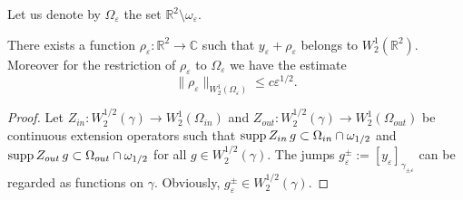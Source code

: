 \documentclass[graybox]{svmult}
\newcommand{\supp}{\mathop{\rm supp}}
\newcommand{\Real}{\mathbb R}
\newcommand{\Cmpl}{\mathbb C}
\newcommand{\eps}{\varepsilon}
\renewcommand{\leq}{\leqslant}
\begin{document}
Let us denote by $\Omega_\eps$ the set $\Real^2\setminus\omega_\eps$.
\begin{lemma}\label{PropW21Corrector}
There exists a function $\rho_\eps\colon \Real^2\to \Cmpl$ such that $y_\eps+\rho_\eps$ belongs to $W_2^1(\Real^2)$. Moreover for the restriction of $\rho_\eps$ to $\Omega_\eps$  we have the estimate
\begin{equation}\label{EstRhoEps}
\|\rho_\eps\|_{W_2^1(\Omega_\eps)}\leq c \eps^{1/2}.
\end{equation}
\end{lemma}

\begin{proof}
Let $Z_{in}\colon W_2^{1/2}(\gamma)\to W_2^1(\Omega_{in})$ and
    $Z_{out}\colon W_2^{1/2}(\gamma)\to W_2^1(\Omega_{out})$
be  continuous extension operators such that
$\supp Z_{in} \,g\subset \Omega_{in}\cap \omega_{1/2}$ and
$\supp Z_{out} \,g\subset \Omega_{out}\cap \omega_{1/2}$
for all $g\in W_2^{1/2}(\gamma)$. The jumps $g_\eps^\pm:=[y_\eps]_{\gamma_{\pm\eps}}$ can be regarded as  functions on $\gamma$. Obviously, $g_\eps^\pm\in W_2^{1/2}(\gamma)$.





\end{proof}
\end{document}
